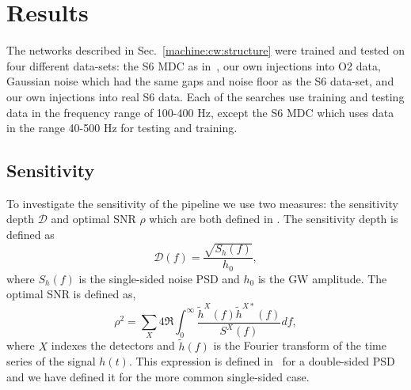 \section{\label{machine:results}Results}

%
The networks described in Sec.~\ref{machine:cw:structure} were trained and tested on
four different data-sets: the S6 \gls{MDC} as
in~\citep{bayley2019SOAPGeneralised,walsh2016ComparisonMethods}, our own
injections into O2 data, Gaussian noise which had the same gaps and noise
floor as the S6 data-set, and our own injections into real S6 data. Each of
the searches use training and testing data in the frequency range of 100-400 Hz,
except the S6 \gls{MDC} which uses data in the range 40-500 Hz for testing and
training. 

\subsection{\label{machine:results:sensitivity} Sensitivity}

%
To investigate the sensitivity of the pipeline we use two measures: the
sensitivity depth $\mathcal{D}$ \cite{prix2007SearchContinuous} and optimal
\gls{SNR} $\rho$ \citep{behnke2015PostprocessingMethods} which are both defined
in \citep{bayley2019SOAPGeneralised}.
The sensitivity depth is defined as
%
\begin{equation}
\label{machine:results:depth}
\mathcal{D}(f) = \frac{\sqrt{S_h(f)}}{h_0},
\end{equation}
%
where $S_h(f)$ is the single-sided noise \gls{PSD} and $h_0$ is the \gls{GW}
amplitude. The optimal \gls{SNR} is defined as,
%
\begin{equation}
\label{machine:results:snr}
\rho^2 = \sum_X 4
\Re\int^{\infty}_{0}\frac{\tilde{h}^X(f)\tilde{h}^{X*}(f)}{S^X(f)}df,
\end{equation}
%
where $X$ indexes the detectors and $\tilde{h}(f)$ is the Fourier transform of
the time series of the signal $h(t)$. This expression is defined
in~\citep{prix2007SearchContinuous} for a double-sided \gls{PSD} and we have
defined it for the more common single-sided case.

